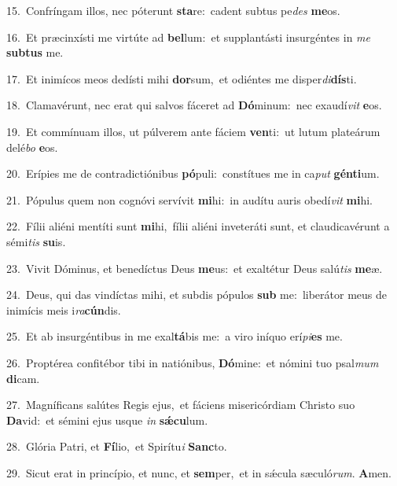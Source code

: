 {\numbfont\textcolor{\numbcolor}{15.}}~Confríngam illos, nec póterunt \textbf{sta}\-re:~\star cadent subtus pe\textit{des} \textbf{me}\-os.\par
{\numbfont\textcolor{\numbcolor}{16.}}~Et præcinxísti me virtúte ad \textbf{bel}\-lum:~\star et supplantásti insurgéntes in \textit{me} \textbf{sub}\-\textbf{tus} me.\par
{\numbfont\textcolor{\numbcolor}{17.}}~Et inimícos meos dedísti mihi \textbf{dor}\-sum,~\star et odiéntes me disper\-\textit{di}\-\textbf{dís}ti.\par
{\numbfont\textcolor{\numbcolor}{18.}}~Clamavérunt, nec erat qui salvos fáceret ad \textbf{Dó}\-minum:~\star nec exaudí\textit{vit} \textbf{e}\-os.\par
{\numbfont\textcolor{\numbcolor}{19.}}~Et commínuam illos, ut púlverem ante fáciem \textbf{ven}\-ti:~\star ut lutum plateárum delé\textit{bo} \textbf{e}\-os.\par
{\numbfont\textcolor{\numbcolor}{20.}}~Erípies me de contradictiónibus \textbf{pó}\-puli:~\star constítues me in ca\textit{put} \textbf{gén}\-\textbf{ti}um.\par
{\numbfont\textcolor{\numbcolor}{21.}}~Pópulus quem non cognóvi servívit \textbf{mi}\-hi:~\star in audítu auris obedí\textit{vit} \textbf{mi}\-hi.\par
{\numbfont\textcolor{\numbcolor}{22.}}~Fílii aliéni mentíti sunt \textbf{mi}\-hi,~\star fílii aliéni inveteráti sunt, et claudicavérunt a sémi\textit{tis} \textbf{su}\-is.\par
{\numbfont\textcolor{\numbcolor}{23.}}~Vivit Dóminus, et benedíctus Deus \textbf{me}\-us:~\star et exaltétur Deus salú\textit{tis} \textbf{me}\-æ.\par
{\numbfont\textcolor{\numbcolor}{24.}}~Deus, qui das vindíctas mihi, et subdis pópulos \textbf{sub} me:~\star liberátor meus de inimícis meis i\-\textit{ra}\-\textbf{cún}dis.\par
{\numbfont\textcolor{\numbcolor}{25.}}~Et ab insurgéntibus in me exal\-\textbf{tá}\-bis me:~\star a viro iníquo erí\-\textit{pi}\-\textbf{es} me.\par
{\numbfont\textcolor{\numbcolor}{26.}}~Proptérea confitébor tibi in natiónibus, \textbf{Dó}\-mine:~\star et nómini tuo psal\textit{mum} \textbf{di}\-cam.\par
{\numbfont\textcolor{\numbcolor}{27.}}~Magníficans salútes Regis ejus,~\dagger et fáciens misericórdiam Christo suo \textbf{Da}\-vid:~\star et sémini ejus usque \textit{in} \textbf{sǽ}\-\textbf{cu}lum.\par
{\numbfont\textcolor{\numbcolor}{28.}}~Glória Patri, et \textbf{Fí}\-lio,~\star et Spirítu\textit{i} \textbf{Sanc}\-to.\par
{\numbfont\textcolor{\numbcolor}{29.}}~Sicut erat in princípio, et nunc, et \textbf{sem}\-per,~\star et in sǽcula sæculó\-\textit{rum}\-. \textbf{A}\-men.\par
